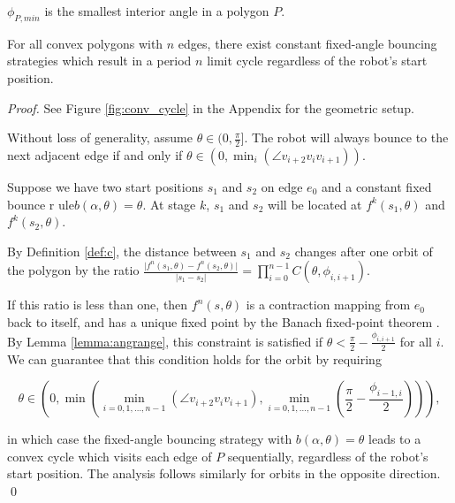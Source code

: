 \documentclass[]{styles/svproc}  %
\begin{document}
\begin{definition}
$\phi_{P,min}$ is the smallest interior angle in a polygon $P$.
\end{definition}

\begin{theorem} \label{thm:convex}
For all convex polygons with $n$ edges, there exist constant fixed-angle bouncing
strategies which result in a period $n$ limit cycle regardless of the robot's start position.
\end{theorem}
\begin{proof}
See Figure \ref{fig:conv_cycle} in the Appendix for the geometric setup.

Without loss of generality, assume $\theta \in (0, \frac{\pi}{2}]$. The robot will always bounce
to the next adjacent edge if and only if
$\theta \in (0, \min_{i}(\angle v_{i+2}v_{i}v_{i+1}))$.

Suppose we have two start positions $s_1$ and $s_2$ on edge $e_0$ and a constant fixed bounce r
ule$b(\alpha, \theta) = \theta$.
At stage $k$, $s_1$ and $s_2$ will be located at $f^{k}(s_1,\theta)$ and
$f^{k}(s_2,\theta)$. 

By Definition \ref{def:c}, the distance between $s_1$ and $s_2$ changes after one orbit of the polygon by the
ratio $\frac{\lvert f^{n}(s_1, \theta) - f^{n}(s_2, \theta) \rvert}{ \lvert s_1
- s_2 \rvert } = \prod_{i = 0}^{n-1}
C(\theta, \phi_{i, i+1})$.

If this ratio is less than one, then $f^n(s,\theta)$ is a contraction
mapping from $e_0$ back to itself, and has a unique fixed point by the Banach fixed-point theorem
\cite{Granas2003}. By Lemma \ref{lemma:angrange}, this constraint is satisfied if  
$\theta < \frac{\pi}{2}-\frac{\phi_{i, i+1}}{2}$ for all $i$. We can guarantee that this
condition holds for the orbit by requiring

\begin{equation*}
\theta \in (0, \min(\min_{i = 0, 1, \dots, n-1}(\angle v_{i+2}v_{i}v_{i+1}),
\min_{i = 0, 1, \dots, n-1}(\frac{\pi}{2}-\frac{\phi_{i-1, i}}{2}))),
\end{equation*}

\noindent
in which case the fixed-angle bouncing strategy with $b(\alpha, \theta) = \theta$ leads to a convex
cycle which visits each edge of $P$ sequentially, regardless of the robot's start position.
The analysis follows similarly for orbits in the opposite direction.
\qed

\end{proof}
\end{document}
